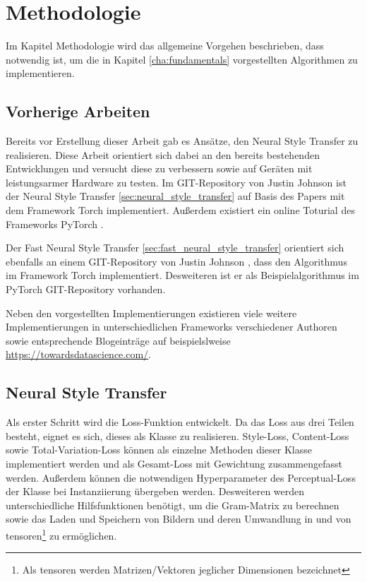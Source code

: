 \chapter{Methodologie}
\label{cha:methodology}

Im Kapitel Methodologie wird das allgemeine Vorgehen beschrieben, dass notwendig ist, um die in Kapitel \ref{cha:fundamentals} vorgestellten Algorithmen zu implementieren.

\section{Vorherige Arbeiten}

Bereits vor Erstellung dieser Arbeit gab es Ansätze, den Neural Style Transfer zu realisieren. Diese Arbeit orientiert sich dabei an den bereits bestehenden Entwicklungen und versucht diese zu verbessern sowie auf Geräten mit leistungsarmer Hardware zu testen. Im GIT-Repository von Justin Johnson \cite{Johnson2015} ist der Neural Style Transfer \ref{sec:neural_style_transfer} auf Basis des Papers \cite{DBLP:journals/corr/GatysEB15a} mit dem Framework Torch \cite{torch} implementiert. Außerdem existiert ein online Toturial des Frameworks PyTorch \cite{OnlineToturialNeuralStylePyTorch}.

Der Fast Neural Style Transfer \ref{sec:fast_neural_style_transfer} orientiert sich ebenfalls an einem GIT-Repository von Justin Johnson \cite{Johnson2016}, dass den Algorithmus im Framework Torch implementiert. Desweiteren ist er als Beispielalgorithmus im PyTorch GIT-Repository \cite{PyTorchFastNeuralStyle} vorhanden.

Neben den vorgestellten Implementierungen existieren viele weitere Implementierungen in unterschiedlichen Frameworks verschiedener Authoren sowie entsprechende Blogeinträge auf beispielslweise \url{https://towardsdatascience.com/}.

\pagebreak

\section{Neural Style Transfer}
\label{sec:method_neural_style_transfer}

Als erster Schritt wird die Loss-Funktion entwickelt. Da das Loss aus drei Teilen besteht, eignet es sich, dieses als Klasse zu realisieren. Style-Loss, Content-Loss sowie Total-Variation-Loss können als einzelne Methoden dieser Klasse implementiert werden und als Gesamt-Loss mit Gewichtung zusammengefasst werden. Außerdem können die notwendigen Hyperparameter des Perceptual-Loss der Klasse bei Instanziierung übergeben werden. Desweiteren werden unterschiedliche Hilfsfunktionen benötigt, um die Gram-Matrix zu berechnen sowie das Laden und Speichern von Bildern und deren Umwandlung in und von \gls{tensor}en\footnote{Als \gls{tensor}en werden Matrizen/Vektoren jeglicher Dimensionen bezeichnet} zu ermöglichen.


